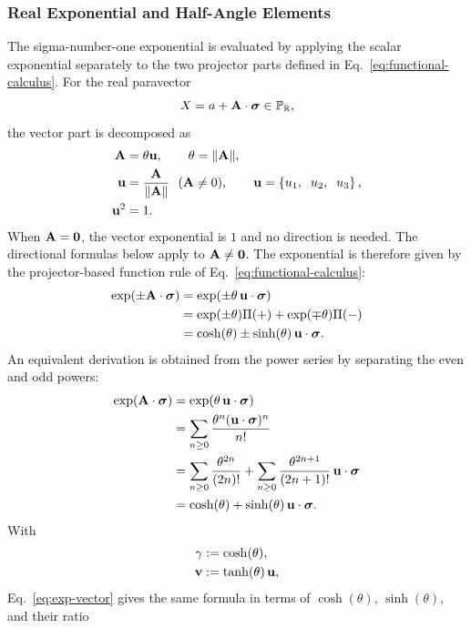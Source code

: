 \subsubsection{Real Exponential and Half-Angle Elements}
The sigma-number-one exponential is evaluated by applying the scalar
exponential separately to the two projector parts defined in
Eq.\ \eqref{eq:functional-calculus}. For the real paravector
\[
X=a+\mathbf{A}\cdot\mathbf{\bm{\sigma}}\in\mathbb{P}_{\mathbb{R}},
\]
the vector part is decomposed as
\begin{equation*}
\begin{aligned}
\mathbf{A}&=\theta \mathbf{u},\qquad \theta=\lVert \mathbf{A}\rVert,\\
\mathbf{u}&=\frac{\mathbf{A}}{\lVert \mathbf{A}\rVert}\ \ (\mathbf{A}\neq 0),\qquad
\mathbf{u}=\left\{u_1,\mkern10mu u_2,\mkern10mu u_3\right\},\\
\mathbf{u}^2&=1.
\end{aligned}
\end{equation*}
When \(\mathbf{A}=\mathbf{0}\), the vector exponential is \(1\) and no direction
is needed. The directional formulas below apply to
\(\mathbf{A}\neq\mathbf{0}\).
The exponential is therefore given by the projector-based function rule of
Eq.\ \eqref{eq:functional-calculus}:
\begin{align}
\exp(\pm\mathbf{A}\cdot\mathbf{\bm{\sigma}})
&= \exp(\pm\theta\,\mathbf{u}\cdot\mathbf{\bm{\sigma}})\notag \\
&= \exp(\pm\theta)\Pi(+) + \exp(\mp\theta)\Pi(-)\notag \\
&= \cosh(\theta) \pm \sinh(\theta)\,\mathbf{u}\cdot\mathbf{\bm{\sigma}}.
\label{eq:exp-vector}
\end{align}
An equivalent derivation is obtained from the power series by separating
the even and odd powers:
\begin{align*}
\exp(\mathbf{A}\cdot\mathbf{\bm{\sigma}})
&= \exp(\theta\,\mathbf{u}\cdot\mathbf{\bm{\sigma}})\notag \\
&= \sum_{n\geq0}\frac{\theta^n(\mathbf{u}\cdot\mathbf{\bm{\sigma}})^n}{n!}\notag \\
&= \sum_{n\geq0}\frac{\theta^{2n}}{(2n)!}
+ \sum_{n\geq0}\frac{\theta^{2n+1}}{(2n+1)!}\,\mathbf{u}\cdot\mathbf{\bm{\sigma}}\notag \\
&= \cosh(\theta)+\sinh(\theta)\,\mathbf{u}\cdot\mathbf{\bm{\sigma}}.
\end{align*}
With
\begin{align*}
\gamma &:= \cosh(\theta),\notag \\
\mathbf{v} &:= \tanh(\theta)\,\mathbf{u},
\end{align*}
Eq.\ \eqref{eq:exp-vector} gives the same formula in terms of
\(\cosh(\theta)\), \(\sinh(\theta)\), and their ratio
